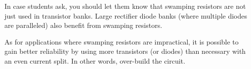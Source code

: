 In case students ask, you should let them know that swamping resistors are not just used in transistor banks.  Large rectifier diode banks (where multiple diodes are paralleled) also benefit from swamping resistors.

As for applications where swamping resistors are impractical, it is possible to gain better reliability by using more transistors (or diodes) than necessary with an even current split.  In other words, over-build the circuit.




